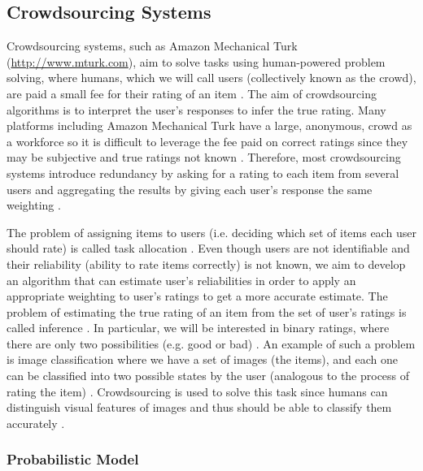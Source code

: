 \documentclass[12pt]{article}
\numberwithin{equation}{section}
\begin{document}
\subsection{Crowdsourcing Systems}
\label{subsec:crowdsourcingSystems}

Crowdsourcing systems, such as Amazon Mechanical Turk (\url{http://www.mturk.com}), aim to solve tasks using human-powered problem solving, where humans, which we will call users (collectively known as the crowd), are paid a small fee for their rating of an item \cite{KOS13,EHR12}. The aim of crowdsourcing algorithms is to interpret the user's responses to infer the true rating. Many platforms including Amazon Mechanical Turk have a large, anonymous, crowd as a workforce so it is difficult to leverage the fee paid on correct ratings since they may be subjective and true ratings not known \cite{KOS13}. Therefore, most crowdsourcing systems introduce redundancy by asking for a rating to each item from several users and aggregating the results by giving each user's response the same weighting \cite{GKM11,KOS13,DDK+13}.

The problem of assigning items to users (i.e. deciding which set of items each user should rate) is called task allocation \cite{KOS13}. Even though users are not identifiable and their reliability (ability to rate items correctly) is not known, we aim to develop an algorithm that can estimate user's reliabilities in order to apply an appropriate weighting to user's ratings to get a more accurate estimate. The problem of estimating the true rating of an item from the set of user's ratings is called inference \cite{KOS13}. In particular, we will be interested in binary ratings, where there are only two possibilities (e.g. good or bad) \cite{GKM11}. An example of such a problem is image classification where we have a set of images (the items), and each one can be classified into two possible states by the user (analogous to the process of rating the item) \cite{KOS13, DKF13}. Crowdsourcing is used to solve this task since humans can distinguish visual features of images and thus should be able to classify them accurately \cite{DKF13}.

\subsubsection{Probabilistic Model}
\label{subsubsec:crowdsourcingProbabilisticModel}
\end{document}
